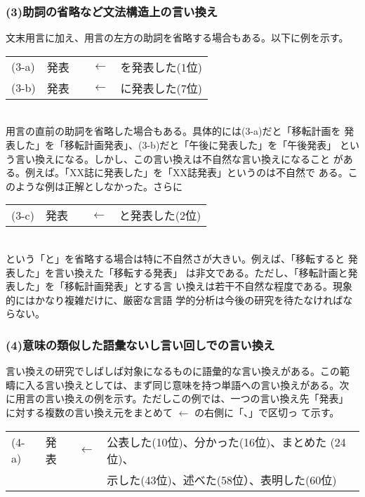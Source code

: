 \documentclass[jnlpbbl]{jnlp_j}
\begin{document}
\subsubsection*{(3)助詞の省略など文法構造上の言い換え}

文末用言に加え、用言の左方の助詞を省略する場合もある。以下に例を示す。
\\

\begin{tabular}{llcl}
(3-a) & 発表　 & $\leftarrow$ &  を発表した(1位) \\
(3-b) & 発表　 & $\leftarrow$ &  に発表した(7位)
\end{tabular}
\\

用言の直前の助詞を省略した場合もある。具体的には(3-a)だと「移転計画を
発表した」を「移転計画発表」、(3-b)だと「午後に発表した」を「午後発表」
という言い換えになる。しかし、この言い換えは不自然な言い換えになること
がある。例えば。「XX誌に発表した」を「XX誌発表」というのは不自然で
ある。このような例は正解としなかった。さらに
\\

\begin{tabular}{llcl}
(3-c) & 発表　 & $\leftarrow$ &  と発表した(2位)
\end{tabular}
\\

という「と」を省略する場合は特に不自然さが大きい。例えば、「移転すると
発表した」を言い換えた「移転する発表」
は非文である。ただし、「移転計画と発表した」を「移転計画発表」とする言
い換えは若干不自然な程度である。現象的にはかなり複雑だけに、厳密な言語
学的分析は今後の研究を待たなければならない。

\subsubsection*{(4)意味の類似した語彙ないし言い回しでの言い換え}

言い換えの研究でしばしば対象になるものに語彙的な言い換えがある。この範
疇に入る言い換えとしては、まず同じ意味を持つ単語への言い換えがある。次
に用言の言い換えの例を示す。ただしこの例では、一つの言い換え先「発表」
に対する複数の言い換え元をまとめて $\leftarrow$ の右側に「、」で区切っ
て示す。
\\

\begin{tabular}{llcl}
(4-a) & 発表 &  $\leftarrow$ & 公表した(10位)、分かった(16位)、まとめた
(24位)、\\
 & & & 示した(43位)、述べた(58位）、表明した(60位) \\
\end{tabular}
\\
\end{document}
